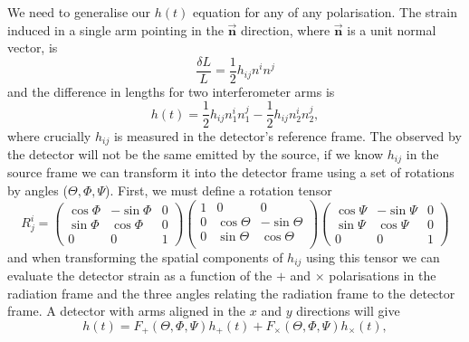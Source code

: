 We need to generalise our $h(t)$ equation for any \gw of any polarisation. The strain induced in a single arm pointing in the $\mathbf{\vec{n}}$ direction, where $\mathbf{\vec{n}}$ is a unit normal vector, is
%
\begin{equation}
    \frac{\delta L}{L} = \frac{1}{2} h_{ij}n^{i}n^{j}
\end{equation}
%
and the difference in lengths for two interferometer arms is
%
\begin{equation}
    h(t) = \frac{1}{2} h_{ij}n_{1}^{i}n_{1}^{j} - \frac{1}{2} h_{ij}n_{2}^{i}n_{2}^{j},
\end{equation}
%
where crucially $h_{ij}$ is measured in the detector's reference frame. The \gw observed by the detector will not be the same \gw emitted by the source, if we know $h_{ij}$ in the source frame we can transform it into the detector frame using a set of rotations by angles ($\Theta, \Phi, \Psi$).
%
%
First, we must define a rotation tensor
%
\begin{equation}
    R^{i}_{j} = 
    \begin{pmatrix}
        \cos\Phi & -\sin\Phi & 0 \\
        \sin\Phi &  \cos\Phi & 0 \\
        0        &  0        & 1
    \end{pmatrix}
    \begin{pmatrix}
        1 & 0 & 0 \\
        0 & \cos\Theta & -\sin\Theta \\
        0 & \sin\Theta & \cos\Theta \\
    \end{pmatrix}
    \begin{pmatrix}
        \cos\Psi & -\sin\Psi & 0 \\
        \sin\Psi &  \cos\Psi & 0 \\
        0        &  0        & 1
    \end{pmatrix}
    \label{1:eq:detector_frame_rotations}
\end{equation}
%
and when transforming the spatial components of $h_{ij}$ using this tensor we can evaluate the detector strain as a function of the $+$ and $\times$ polarisations in the radiation frame and the three angles relating the radiation frame to the detector frame. A detector with arms aligned in the $x$ and $y$ directions will give
%
\begin{equation}
    h(t) = F_{+}(\Theta, \Phi, \Psi)h_{+}(t) + F_{\times}(\Theta, \Phi, \Psi)h_{\times}(t) ,
    \label{1:eq:h_t_linear_combination}
\end{equation}
